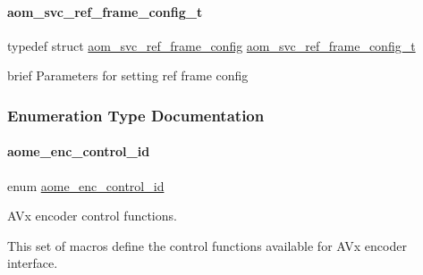 \paragraph{\texorpdfstring{aom\+\_\+svc\+\_\+ref\+\_\+frame\+\_\+config\+\_\+t}{aom\_svc\_ref\_frame\_config\_t}}
{\footnotesize\ttfamily typedef struct \hyperlink{structaom__svc__ref__frame__config}{aom\+\_\+svc\+\_\+ref\+\_\+frame\+\_\+config}  \hyperlink{group__aom__encoder_ga23962dd5c557ff4ffba600a510ae38ab}{aom\+\_\+svc\+\_\+ref\+\_\+frame\+\_\+config\+\_\+t}}

brief Parameters for setting ref frame config 

\subsubsection{Enumeration Type Documentation}
\mbox{\label{group__aom__encoder_gae78dde67a6d78f332e9bdba0dde42db5}} 
\paragraph{\texorpdfstring{aome\+\_\+enc\+\_\+control\+\_\+id}{aome\_enc\_control\_id}}
{\footnotesize\ttfamily enum \hyperlink{group__aom__encoder_gae78dde67a6d78f332e9bdba0dde42db5}{aome\+\_\+enc\+\_\+control\+\_\+id}}



A\+Vx encoder control functions. 

This set of macros define the control functions available for A\+Vx encoder interface.

